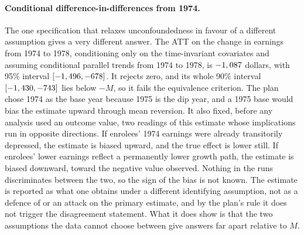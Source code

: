\documentclass[11pt]{article}
\newcommand{\ci}[2]{$[#1, #2]$}
\begin{document}
\paragraph{Conditional difference-in-differences from 1974.} The one specification that
relaxes unconfoundedness in favour of a different assumption gives a very different answer.
The ATT on the change in earnings from 1974 to 1978, conditioning only on the time-invariant
covariates and assuming conditional parallel trends from 1974 to 1978, is
$-1,087$ dollars, with 95\% interval
\ci{\DiffSeventyFourCILow}{\DiffSeventyFourCIHigh}. It rejects zero, and its whole 90\%
interval \ci{\DiffSeventyFourCINinetyLow}{\DiffSeventyFourCINinetyHigh} lies below $-M$, so it
fails the equivalence criterion. The plan chose 1974 as the base year because 1975 is the dip
year, and a 1975 base would bias the estimate upward through mean reversion. It also fixed,
before any analysis used an outcome value, two readings of this estimate whose implications run in
opposite directions. If enrolees' 1974 earnings were already transitorily depressed, the
estimate is biased upward, and the true effect is lower still. If enrolees' lower earnings
reflect a permanently lower growth path, the estimate is biased downward, toward the negative
value observed. Nothing in the runs discriminates between the two, so the sign of the bias is
not known. The estimate is reported as what one obtains under a different identifying
assumption, not as a defence of or an attack on the primary estimate, and by the plan's rule
it does not trigger the disagreement statement. What it does show is that the two assumptions
the data cannot choose between give answers far apart relative to $M$.
\end{document}
